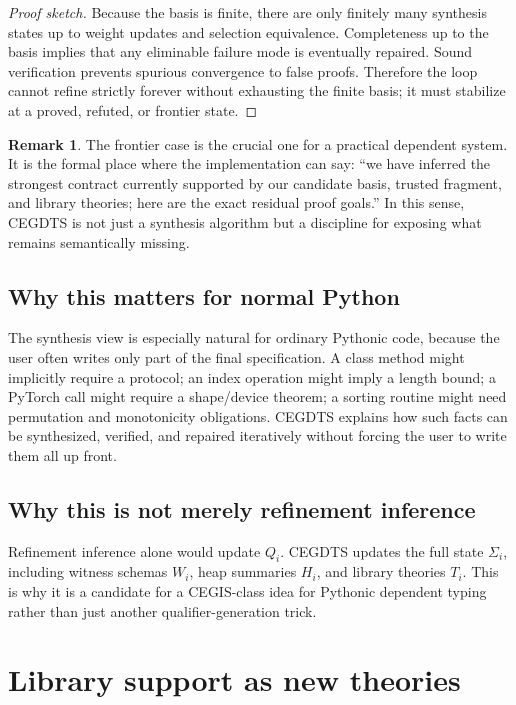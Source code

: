 \documentclass[11pt]{article}
\theoremstyle{definition}
\newtheorem{remark}[definition]{Remark}
\theoremstyle{plain}
\begin{document}
\begin{proof}[Proof sketch]
Because the basis is finite, there are only finitely many synthesis states up to
weight updates and selection equivalence. Completeness up to the basis implies
that any eliminable failure mode is eventually repaired. Sound verification
prevents spurious convergence to false proofs. Therefore the loop cannot refine
strictly forever without exhausting the finite basis; it must stabilize at a
proved, refuted, or frontier state.
\end{proof}

\begin{remark}
The frontier case is the crucial one for a practical dependent system. It is the
formal place where the implementation can say: ``we have inferred the strongest
contract currently supported by our candidate basis, trusted fragment, and
library theories; here are the exact residual proof goals.'' In this sense,
\textsc{CEGDTS} is not just a synthesis algorithm but a discipline for exposing
what remains semantically missing.
\end{remark}

\subsection{Why this matters for normal Python}
The synthesis view is especially natural for ordinary Pythonic code, because the
user often writes only part of the final specification. A class method might
implicitly require a protocol; an index operation might imply a length bound; a
PyTorch call might require a shape/device theorem; a sorting routine might need
permutation and monotonicity obligations. \textsc{CEGDTS} explains how such facts
can be synthesized, verified, and repaired iteratively without forcing the user
to write them all up front.

\subsection{Why this is not merely refinement inference}
Refinement inference alone would update $Q_i$. \textsc{CEGDTS} updates the full
state $\Sigma_i$, including witness schemas $W_i$, heap summaries $H_i$, and
library theories $T_i$. This is why it is a candidate for a CEGIS-class idea for
Pythonic dependent typing rather than just another qualifier-generation trick.


\section{Library support as new theories}
\end{document}
